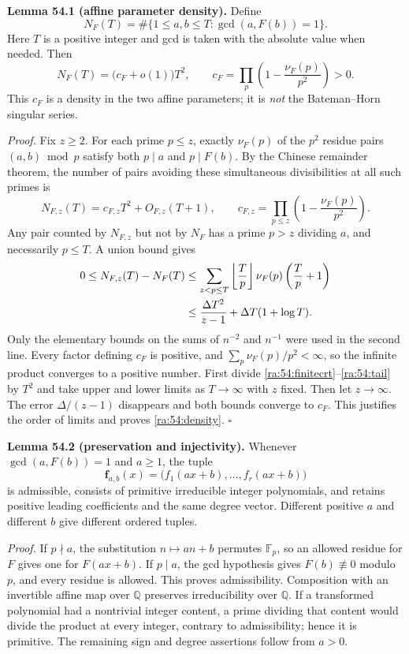 \documentclass[11pt]{article}
\newcommand{\Q}{\mathbb{Q}}
\newcommand{\F}{\mathbb{F}}
\begin{document}
\textbf{Lemma 54.1 (affine parameter density).} Define
\[
 N_F(T)=\#\{1\le a,b\le T:\gcd(a,F(b))=1\}.
\]
Here $T$ is a positive integer and gcd is taken with the absolute value
when needed. Then
\begin{equation}\label{ra:54:density}
 N_F(T)=\bigl(c_F+o(1)\bigr)T^2,
 \qquad
 c_F=\prod_p\left(1-\frac{\nu_F(p)}{p^2}\right)>0.
\end{equation}
This $c_F$ is a density in the two affine parameters; it is \emph{not}
the Bateman--Horn singular series.

\textit{Proof.} Fix $z\ge2$. For each prime $p\le z$, exactly
$\nu_F(p)$ of the $p^2$ residue pairs $(a,b)\bmod p$ satisfy both
$p\mid a$ and $p\mid F(b)$. By the Chinese remainder theorem, the number
of pairs avoiding these simultaneous divisibilities at all such primes is
\begin{equation}\label{ra:54:finitecrt}
 N_{F,z}(T)=c_{F,z}T^2+O_{F,z}(T+1),\qquad
 c_{F,z}=\prod_{p\le z}\left(1-\frac{\nu_F(p)}{p^2}\right).
\end{equation}
Any pair counted by $N_{F,z}$ but not by $N_F$ has a prime $p>z$
dividing $a$, and necessarily $p\le T$. A union bound gives
\begin{align}
 0\le N_{F,z}(T)-N_F(T)
 &\le\sum_{z<p\le T}\left\lfloor\frac{T}{p}\right\rfloor
       \nu_F(p)\left(\frac{T}{p}+1\right)\notag\\
 &\le\frac{\Delta T^2}{z-1}
       +\Delta T(1+\log T).\label{ra:54:tail}
\end{align}
Only the elementary bounds on the sums of $n^{-2}$ and $n^{-1}$ were
used in the second line. Every factor defining $c_F$ is positive, and
$\sum_p\nu_F(p)/p^2<\infty$, so the infinite product converges to a
positive number. First divide \eqref{ra:54:finitecrt}--\eqref{ra:54:tail}
by $T^2$ and take upper and lower limits as $T\to\infty$ with $z$ fixed.
Then let $z\to\infty$. The error $\Delta/(z-1)$ disappears and both
bounds converge to $c_F$. This justifies the order of limits and proves
\eqref{ra:54:density}. \hfill$\square$

\textbf{Lemma 54.2 (preservation and injectivity).} Whenever
$\gcd(a,F(b))=1$ and $a\ge1$, the tuple
\[
 \mathbf f_{a,b}(x)=\bigl(f_1(ax+b),\ldots,f_r(ax+b)\bigr)
\]
is admissible, consists of primitive irreducible integer polynomials,
and retains positive leading coefficients and the same degree vector.
Different positive $a$ and different $b$ give different ordered tuples.

\textit{Proof.} If $p\nmid a$, the substitution $n\mapsto an+b$
permutes $\F_p$, so an allowed residue for $F$ gives one for
$F(ax+b)$. If $p\mid a$, the gcd hypothesis gives $F(b)\not\equiv0$
modulo $p$, and every residue is allowed. This proves admissibility.
Composition with an invertible affine map over $\Q$ preserves
irreducibility over $\Q$. If a transformed polynomial had a nontrivial
integer content, a prime dividing that content would divide the product
at every integer, contrary to admissibility; hence it is primitive.
The remaining sign and degree assertions follow from $a>0$.
\end{document}
